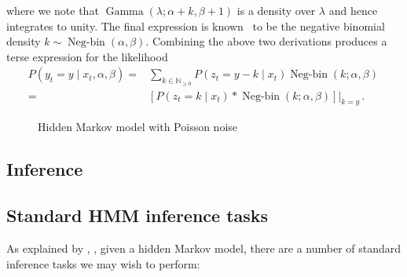 \documentclass[twoside, 11pt]{article}
\DeclareMathOperator*{\gammad}{Gamma}
\DeclareMathOperator*{\negbind}{Neg-bin}
\newcommand{\nonnegint}[0] {\mathbb{N}_{\geq 0}}
\begin{document}
where we note that $\gammad(\lambda ; \alpha+k, \beta+1)$ is a density over $\lambda$ and hence integrates to unity. The final expression is known~\citep{gelman2013bayesian} to be the negative binomial density $k \sim \negbind\left(\alpha, \beta\right)$. Combining the above two derivations produces a terse expression for the likelihood
\begin{align}
P(y_t=y \mid x_t, \alpha, \beta)
= & \sum_{k \in \nonnegint} P(z_t = y-k \mid x_t) \negbind\left(k ; \alpha, \beta\right) \, \nonumber \\
= & \left[ P(z_t=k \mid x_t) * \negbind(k ; \alpha, \beta) \right] \Bigr \rvert_{k=y} \, . \label{eqn:hybridobs}
\end{align}


\begin{figure}
\caption{Hidden Markov model with Poisson noise}
\label{fig:hmmpoisson}
\end{figure}

\subsection{Inference}
\subsection{Standard HMM inference tasks}

As explained by \citet{rabiner1989tutorial}, \citet*{russell2002artificial}, given a hidden Markov model, there are a number of standard inference tasks we may wish to perform:
\end{document}
